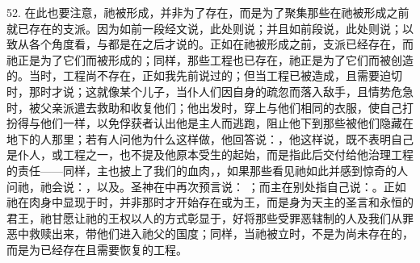 52. 在此也要注意，祂被形成，并非为了存在，而是为了聚集那些在祂被形成之前就已存在的支派。因为如前一段经文说，此处则说；并且如前段说，此处则说；以致从各个角度看，与都是在之后才说的。正如在祂被形成之前，支派已经存在，而祂正是为了它们而被形成的；同样，那些工程也已存在，祂正是为了它们而被创造的。当时，工程尚不存在，正如我先前说过的；但当工程已被造成，且需要迫切时，那时才说；这就像某个儿子，当仆人们因自身的疏忽而落入敌手，且情势危急时，被父亲派遣去救助和收复他们；他出发时，穿上与他们相同的衣服，使自己打扮得与他们一样，以免俘获者认出他是主人而逃跑，阻止他下到那些被他们隐藏在地下的人那里；若有人问他为什么这样做，他回答说：，他这样说，既不表明自己是仆人，或工程之一，也不提及他原本受生的起始，而是指此后交付给他治理工程的责任——同样，主也披上了我们的血肉，，如果那些看见祂如此并感到惊奇的人问祂，祂会说：，以及。圣神在中再次预言说： ；而主在别处指自己说：。正如祂在肉身中显现于时，并非那时才开始存在或为王，而是身为天主的圣言和永恒的君王，祂甘愿让祂的王权以人的方式彰显于，好将那些受罪恶辖制的人及我们从罪恶中救赎出来，带他们进入祂父的国度；同样，当祂被立时，不是为尚未存在的，而是为已经存在且需要恢复的工程。\par

